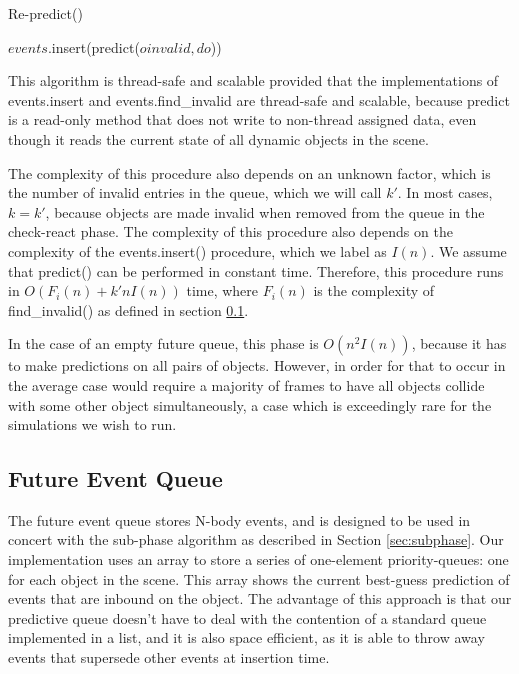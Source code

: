 \documentclass[CEJCS,PDF]{cej} %
\begin{document}
\begin{algorithm}
\caption{Re-predict()}
\begin{algorithmic}
\STATE {}
	\STATE {}
			\STATE $events$.insert(predict($oinvalid,do$))
		\ENDFOR
	\ENDIF
\ENDFOR
\end{algorithmic}
\end{algorithm}
This algorithm is thread-safe and scalable provided that the implementations of events.insert and events.find\_invalid are thread-safe and scalable, because predict is a read-only method that 
does not write to non-thread assigned data, even though it reads the current state of all dynamic objects in the scene.

The complexity of this procedure also depends on an unknown factor, which is the number of invalid entries in the queue, which we will call $k'$.  In most cases, $k=k'$, because objects are made invalid
when removed from the queue in the check-react phase.
The complexity of this procedure also depends on the complexity of the events.insert() procedure, which we label as $I(n)$.  We assume that predict() can be performed in constant time.
Therefore, this procedure runs in $O(F_i(n)+k' n I(n))$ time, where $F_i(n)$ is the complexity of find\_invalid() as defined in section \ref{feq}.

In the case of an empty future queue, this phase is $O(n^2 I(n))$, because it has to make predictions on all pairs of objects.  However, in order for that to occur in the average case would require a majority of frames to have all objects collide
with some other object simultaneously, a case which is exceedingly rare for the simulations we wish to run.

\subsection{Future Event Queue}
\label{feq}
The future event queue stores N-body events, and is designed to be used in concert with the sub-phase algorithm as described in Section \ref{sec:subphase}.
Our implementation uses an array to store a series of one-element priority-queues: one for each object in the scene.  This array shows the current best-guess
prediction of events that are inbound on the object.  The advantage of this approach is that our predictive queue doesn't have to deal with the contention of 
a standard queue implemented in a list, and it is also space efficient, as it is able to throw away events that supersede other events at insertion time.
\end{document}
